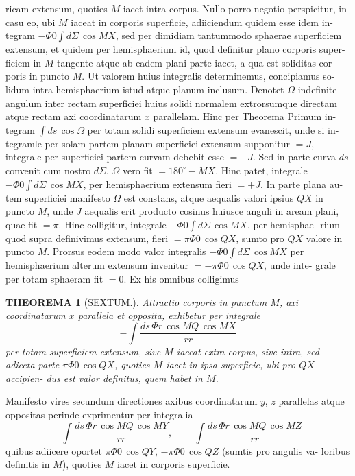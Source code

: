 \documentclass[12pt,a4paper]{article}
\theoremstyle{gauss}
\newtheorem*{theorema}{THEOREMA}
\begin{document}
ricam extensum, quoties $M$ iacet intra corpus. Nullo porro negotio perspicitur,
in casu eo, ubi $M$ iaceat in corporis superficie, adiiciendum quidem esse idem in-
tegram $-\Phi 0\int d\Sigma\,\cos MX$, sed per dimidiam tantummodo sphaerae superficiem
extensum, et quidem per hemisphaerium id, quod definitur plano corporis super-
ficiem in $M$ tangente atque ab eadem plani parte iacet, a qua est soliditas cor-
poris in puncto $M$. Ut valorem huius integralis determinemus, concipiamus so-
lidum intra hemisphaerium istud atque planum inclusum. Denotet $\Omega$ indefinite
angulum inter rectam superficiei huius solidi normalem extrorsumque directam
atque rectam axi coordinatarum $x$ parallelam. Hinc per Theorema Primum in-
tegram $\int ds\,\cos\Omega$ per totam solidi superficiem extensum evanescit, unde si in-
tegramle per solam partem planam superficiei extensum supponitur $=J$, integrale
per superficiei partem curvam debebit esse $=-J$. Sed in parte curva $ds$
convenit cum nostro $d\Sigma$, $\Omega$ vero fit $=180^\circ-MX$. Hinc patet, integrale
$-\Phi 0\int d\Sigma\,\cos MX$, per hemisphaerium extensum fieri $=+J$. In parte plana au-
tem superficiei manifesto $\Omega$ est constans, atque aequalis valori ipsius $QX$ in
puncto $M$, unde $J$ aequalis erit producto cosinus huiusce anguli in aream plani,
quae fit $=\pi$. Hinc colligitur, integrale $-\Phi 0\int d\Sigma\,\cos MX$, per hemisphae-
rium quod supra definivimus extensum, fieri $=\pi\Phi 0\,\cos QX$, sumto pro $QX$
valore in puncto $M$. Prorsus eodem modo valor integralis $-\Phi 0\int d\Sigma\,\cos MX$
per hemisphaerium alterum extensum invenitur $=-\pi\Phi 0\,\cos QX$, unde inte-
grale per totam sphaeram fit $=0$. Ex his omnibus colligimus

\newpage
\setcounter{page}{19}

\begin{theorema}[SEXTUM.]
Attractio corporis in punctum $M$, axi coordinatarum $x$ parallela et opposita,
exhibetur per integrale
\[
-\int\frac{ds\,\Phi r\,\cos MQ\,\cos MX}{rr}
\]
per totam superficiem extensum, sive $M$ iaceat extra corpus, sive intra, sed adiecta
parte $\pi\Phi 0\,\cos QX$, quoties $M$ iacet in ipsa superficie, ubi pro $QX$ accipien-
dus est valor definitus, quem habet in $M$.
\end{theorema}

Manifesto vires secundum directiones axibus coordinatarum $y$, $z$ parallelas
atque oppositas perinde exprimentur per integralia
\[
-\int\frac{ds\,\Phi r\,\cos MQ\,\cos MY}{rr},\quad -\int\frac{ds\,\Phi r\,\cos MQ\,\cos MZ}{rr}
\]
quibus adiicere oportet $\pi\Phi 0\,\cos QY$, $-\pi\Phi 0\,\cos QZ$ (sumtis pro angulis va-
loribus definitis in $M$), quoties $M$ iacet in corporis superficie.
\end{document}
